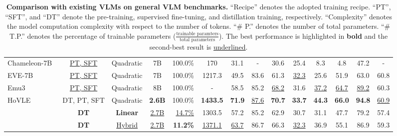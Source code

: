 \begin{table*}[t!]
{\begin{tabular}{l c c c r | c c c c c c |c  c c }
    Chameleon-7B~\cite{chameleon}  & \underline{PT, SFT}& Quadratic &  7B& 100.0\%   & 170 & 31.1 & - & 30.6 & 25.4 & 8.3 & 4.8 & 47.2 & -\\  
    EVE-7B~\cite{eve}  & \underline{PT, SFT}& Quadratic &  7B& 100.0\%  & 1217.3 & 49.5 & 83.6 & 61.3 & \underline{32.3} & 25.6& 51.9 & 63.0 & 60.8 \\
    Emu3~\cite{emu3} & \underline{PT, SFT}& Quadratic & 8B& 100.0\%  & - & 58.5 & 85.2 & \underline{68.2} & 31.6 & \underline{37.2} & \underline{64.7} & \underline{89.2} & 60.3\\
    HoVLE~\cite{hovle} & DT, PT, SFT & Quadratic & \textbf{2.6B}& 100.0\%  & \textbf{1433.5} & \textbf{71.9} & \underline{87.6} & \textbf{70.7} & \textbf{33.7} & \textbf{44.3} & \textbf{66.0} & \textbf{94.8} & \underline{60.9} \\
    \rowcolor{green!15}
    \name{} & \textbf{DT} & \textbf{Linear} & \underline{2.7B}& \underline{14.7\%}  &1303.5 & 57.2 & 85.2 & 62.9& 30.7  & 31.1 &47.7 & 79.2 & 57.4 \\
    \rowcolor{yellow!15}
    \name{} & \textbf{DT} & \underline{Hybrid} & \underline{2.7B}& \textbf{11.2\%}  & \underline{1371.1} & \underline{63.7} & 86.7 & 66.3 & \underline{32.3} & 36.9 & 55.1 & 86.9 & 59.3  \\
    
    \bottomrule
    \end{tabular}
    }
    \vspace{-1em}
    \caption{\textbf{Comparison with existing VLMs on general VLM benchmarks.} ``Recipe'' denotes the adopted training recipe. ``PT'', ``SFT'', and ``DT'' denote the pre-training, supervised fine-tuning, and distillation training, respectively. ``Complexity'' denotes the model computation complexity with respect to the number of tokens. ``\# P.'' denotes the number of total parameters. ``\# T.P.'' denotes the percentage of trainable parameters ($\frac{\text{trainable paramters}}{\text{total parameters}}$). The best performance is highlighted in \textbf{bold} and the second-best result is \underline{underlined}.}
    \label{tab:results_general}
    \end{table*}
